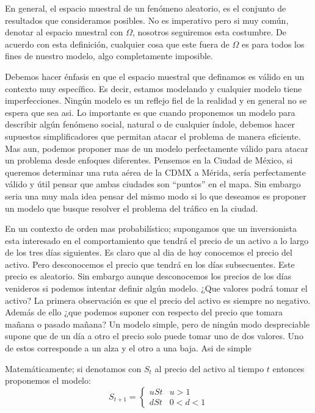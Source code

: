 \documentclass[14pt]{extreport}
\begin{document}
En general, el espacio muestral de un fenómeno aleatorio, es el conjunto de resultados que consideramos posibles. No es imperativo pero si muy común, denotar al espacio muestral con $\Omega$, nosotros seguiremos esta costumbre. De acuerdo con esta definición, cualquier cosa que este fuera de $\Omega$ es para todos los fines de nuestro modelo, algo completamente imposible.

Debemos hacer énfasis en que el espacio muestral que definamos es válido en un contexto muy específico. Es decir, estamos modelando y cualquier modelo tiene imperfecciones. Ningún modelo es un reflejo fiel de la realidad y en general no se espera que sea asi. Lo importante es que cuando proponemos un modelo para describir algún fenómeno social, natural o de cualquier índole, debemos hacer supuestos simplificadores que permitan atacar el problema de manera eficiente. Mas aun, podemos proponer mas de un modelo perfectamente válido para atacar un problema desde enfoques diferentes. Pensemos en la Ciudad de México, si queremos determinar una ruta aérea de la CDMX a Mérida, sería perfectamente válido y útil pensar que ambas ciudades son ``puntos'' en el mapa. Sin embargo seria una muy mala idea pensar del mismo modo si lo que deseamos es proponer un modelo que busque resolver el problema del tráfico en la ciudad.

En un contexto de orden mas probabilístico; supongamos que un inversionista esta interesado en el comportamiento que tendrá el precio de un activo a lo largo de los tres días siguientes. Es claro que al dia de hoy conocemos el precio del activo. Pero desconocemos el precio que tendrá en los días subsecuentes. Este precio es aleatorio. Sin embargo aunque desconocemos los precios de los días venideros si podemos intentar definir algún modelo. ¿Que valores podrá tomar el activo? La primera observación es que el precio del activo es siempre no negativo. Además de ello ¿que podemos suponer con respecto del precio que tomara mañana o pasado mañana? Un modelo simple, pero de ningún modo despreciable supone que de un día a otro el precio solo puede tomar uno de dos valores. Uno de estos corresponde a un alza y el otro a una baja. Asi de simple

Matemáticamente; si denotamos con $S_t$ al precio del activo al tiempo $t$ entonces proponemos el modelo:
$$
S_{t+1} = \begin{cases}
  uSt & u > 1 \\
  dSt & 0 < d < 1
\end{cases}
$$
\end{document}
